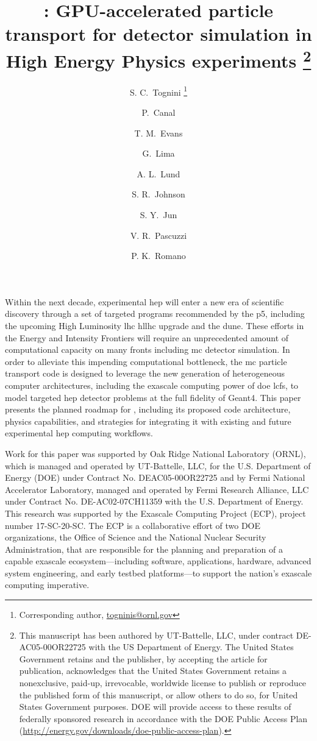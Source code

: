 \documentclass[11pt]{article}
\title
{%
 \celeritas: GPU-accelerated particle transport for detector simulation in High
 Energy Physics experiments \footnote{This manuscript has been authored by
 UT-Battelle, LLC, under contract DE-AC05-00OR22725 with the US Department of
 Energy. The United States Government retains and the publisher, by accepting
 the article for publication, acknowledges that the United States Government
 retains a nonexclusive, paid-up, irrevocable, worldwide license to publish or
 reproduce the published form of this manuscript, or allow others to do so, for
 United States Government purposes. DOE will provide access to these results of
 federally sponsored research in accordance with the DOE Public Access Plan
  (\url{http://energy.gov/downloads/doe-public-access-plan}).}%
}
\date{}
\author[1]{S. C.~Tognini%
  \footnote{Corresponding author,
  \href{mailto:togninis@ornl.gov}{togninis@ornl.gov}}
}
\author[2]{P.~Canal}
\author[1]{T. M.~Evans}
\author[2]{G.~Lima}
\author[3]{A. L.~Lund}
\author[1]{S. R.~Johnson}
\author[2]{S. Y.~Jun}
\author[4]{V. R.~Pascuzzi}
\author[3]{P. K.~Romano}
\affil[1]{Oak Ridge National Laboratory, Oak Ridge, TN 37831, USA}
\affil[2]{Fermi National Accelerator Laboratory, Batavia, IL 60510, USA}
\affil[3]{Argonne National Laboratory, Lemont, IL 60439, USA}
\affil[4]{Brookhaven National Laboratory, Upton, NY 11973, USA}
\begin{document}
\maketitle

\begin{Abstract}
Within the next decade, experimental \ac{hep} will enter a new era of scientific
discovery through a set of targeted programs recommended by the \ac{p5},
including the upcoming High Luminosity \ac{lhc} \acs{hllhc} upgrade and the
\ac{dune}. These efforts in the Energy and Intensity Frontiers will require an
unprecedented amount of computational capacity on many fronts including \ac{mc}
detector simulation. In order to alleviate this impending computational
bottleneck, the \celeritas \ac{mc}  particle transport code is designed to
leverage the new generation of heterogeneous computer architectures, including
the exascale computing power of \ac{doe} \acp{lcf}, to model targeted \ac{hep}
detector problems at the full fidelity of Geant4. This paper presents the
planned roadmap for \celeritas, including its proposed code architecture,
physics capabilities, and strategies for integrating it with existing and future
experimental \ac{hep} computing workflows.
\end{Abstract}

\snowmass







\Acknowledgements
Work for this paper was supported by Oak Ridge National Laboratory (ORNL), which
is managed and operated by UT-Battelle, LLC, for the U.S. Department of Energy
(DOE) under Contract No. DEAC05-00OR22725 and by Fermi National Accelerator
Laboratory, managed and operated by Fermi Research Alliance, LLC under Contract
No. DE-AC02-07CH11359 with the U.S. Department of Energy.
This research was supported by the Exascale Computing Project (ECP), project
number 17-SC-20-SC. The ECP is a collaborative effort of two DOE organizations,
the Office of Science and the National Nuclear Security Administration, that are
responsible for the planning and preparation of a capable exascale
ecosystem---including software, applications, hardware, advanced system
engineering, and early testbed platforms---to support the nation's exascale
computing imperative.

\printbibliography

\end{document}
